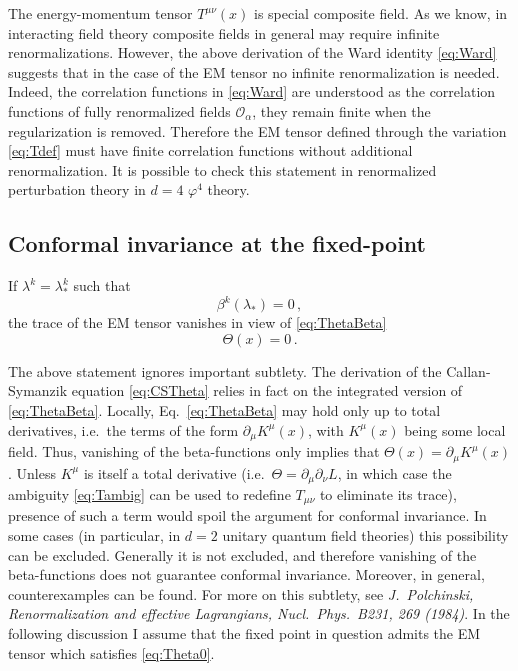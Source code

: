 The energy-momentum tensor $T^{\mu\nu}(x)$ is special composite field. As we know,
in interacting field theory composite fields in general may require infinite
renormalizations. However, the above derivation of the Ward identity
\eqref{eq:Ward} suggests that in the case of the EM tensor no infinite
renormalization is needed. Indeed, the correlation functions in \eqref{eq:Ward}
are understood as the correlation functions of fully renormalized fields
$\mathcal O_\alpha$, they remain finite when the regularization is removed.
Therefore the EM tensor defined through the variation \eqref{eq:Tdef} must have
finite correlation functions without additional renormalization. It is possible to
check this statement in renormalized perturbation theory in $d=4$ $\varphi^4$
theory.

\subsection*{Conformal invariance at the fixed-point}

If $\lambda^k=\lambda^k_*$ such that
\[
\beta^k(\lambda_*)=0\,,
\]
the trace of the EM tensor vanishes in view of \eqref{eq:ThetaBeta}
\begin{equation}\label{eq:Theta0}
\Theta(x)=0\,.
\end{equation}

\begin{remark}
The above statement ignores important subtlety. The derivation of the
Callan-Symanzik equation \eqref{eq:CSTheta} relies in fact on the integrated version
of \eqref{eq:ThetaBeta}. Locally, Eq.~\eqref{eq:ThetaBeta} may hold only up to total
derivatives, i.e.\ the terms of the form $\partial_\mu K^\mu(x)$, with $K^\mu(x)$
being some local field. Thus, vanishing of the beta-functions only implies that
$\Theta(x)=\partial_\mu K^\mu(x)$. Unless $K^\mu$ is itself a total derivative
(i.e.\ $\Theta=\partial_\mu\partial_\nu L$, in which case the ambiguity
\eqref{eq:Tambig} can be used to redefine $T_{\mu\nu}$ to eliminate its trace),
presence of such a term would spoil the argument for conformal invariance. In some
cases (in particular, in $d=2$ unitary quantum field theories) this possibility can
be excluded. Generally it is not excluded, and therefore vanishing of the
beta-functions does not guarantee conformal invariance. Moreover, in general,
counterexamples can be found. For more on this subtlety, see \emph{J.~Polchinski,
Renormalization and effective Lagrangians, Nucl.\ Phys.\ B231, 269 (1984)}. In the
following discussion I assume that the fixed point in question admits the EM tensor
which satisfies \eqref{eq:Theta0}.
\end{remark}

